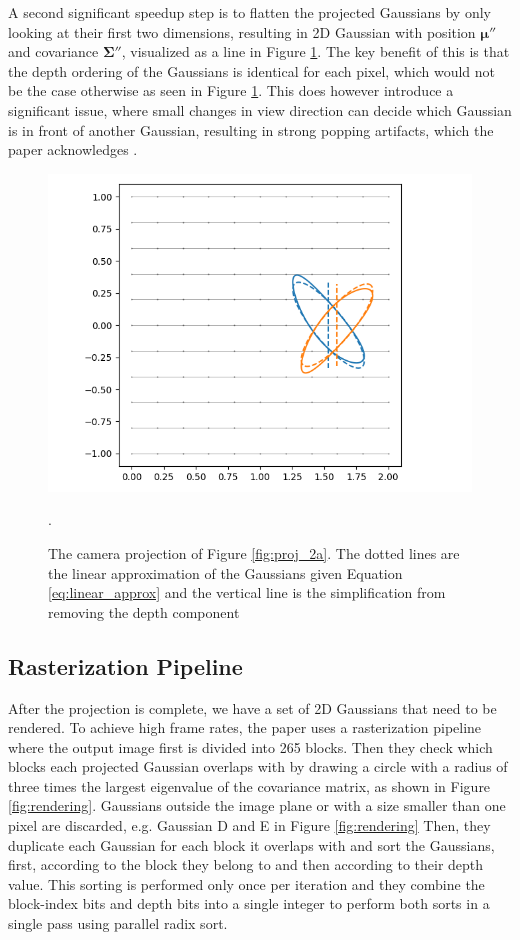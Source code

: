 A second significant speedup step is to flatten the projected Gaussians by only looking at their first two dimensions, resulting in 2D Gaussian with position $\bm{\mu}''$ and covariance $\bm{\Sigma}''$, visualized as a line in Figure \ref{fig:proj_2b}.
The key benefit of this is that the depth ordering of the Gaussians is identical for each pixel, which would not be the case otherwise as seen in Figure \ref{fig:proj_2b}.
This does however introduce a significant issue, where small changes in view direction can decide which Gaussian is in front of another Gaussian, resulting in strong popping artifacts, which the paper acknowledges \cite[Sec 7.4]{kerbl3DGaussianSplatting2023}.

\begin{figure}[htb]
    \centering
    \includegraphics[width=\linewidth]{images/projb.png}
    \caption{The camera projection of Figure \ref{fig:proj_2a}. The dotted lines are the linear approximation of the Gaussians given Equation \ref{eq:linear_approx} and the vertical line is the simplification from removing the depth component}.
    \label{fig:proj_2b}
\end{figure}


\subsection{Rasterization Pipeline}
\label{sec:rasterization}
After the projection is complete, we have a set of 2D Gaussians that need to be rendered.
To achieve high frame rates, the paper uses a rasterization pipeline where the output image first is divided into 265 blocks.
Then they check which blocks each projected Gaussian overlaps with by drawing a circle with a radius of three times the largest eigenvalue of the covariance matrix, as shown in Figure \ref{fig:rendering}.
Gaussians outside the image plane or with a size smaller than one pixel are discarded, e.g. Gaussian D and E in Figure \ref{fig:rendering}
Then, they duplicate each Gaussian for each block it overlaps with and sort the Gaussians, first, according to the block they belong to and then according to their depth value.
This sorting is performed only once per iteration and they combine the block-index bits and depth bits into a single integer to perform both sorts in a single pass using parallel radix sort.

